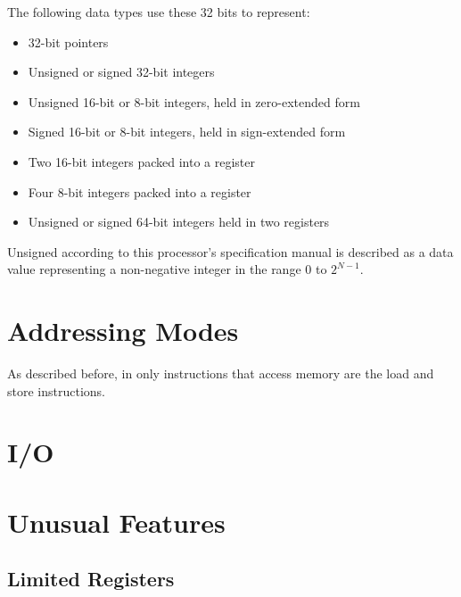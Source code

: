 \documentclass[12pt]{scrreprt}
\begin{document}
	The following data types use these 32 bits to represent:

	\begin{itemize}
		\item{32-bit pointers}
		\item{Unsigned or signed 32-bit integers}
		\item{Unsigned 16-bit or 8-bit integers, held in zero-extended form}
		\item{Signed 16-bit or 8-bit integers, held in sign-extended form}
		\item{Two 16-bit integers packed into a register}
		\item{Four 8-bit integers packed into a register}
		\item{Unsigned or signed 64-bit integers held in two registers}
	\end{itemize}

	Unsigned according to this processor's specification manual is described as a data value representing a non-negative integer in the
	range $0$ to $2^{N-1}$.

{\let\clearpage\relax\chapter{Addressing Modes}}

	As described before, in \iffalse Gotta put reference here \fi only instructions that access memory are the load and store instructions.

{\let\clearpage\relax\chapter{I/O}}

{\let\clearpage\relax\chapter{Unusual Features}}
	
	\section{Limited Registers}
\end{document}
